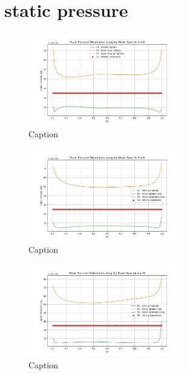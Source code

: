 \section{static pressure}
\begin{figure}[H]
    \centering
    \includegraphics[width=0.6\textwidth]{Figures/pres_static_6.png}
    \caption{Caption}
    \label{fig:enter-label}
\end{figure}
\begin{figure}[H]
    \centering
    \includegraphics[width=0.6\textwidth]{Figures/pres_static_8.png}
    \caption{Caption}
    \label{fig:enter-label}
\end{figure}
\begin{figure}[H]
    \centering
    \includegraphics[width=0.6\textwidth]{Figures/pres_static_10.png}
    \caption{Caption}
    \label{fig:enter-label}
\end{figure}

